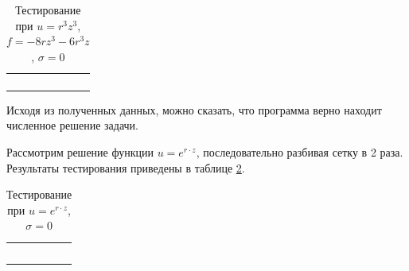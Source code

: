 \begin{table}
	\caption{Тестирование при $u = r^3 z^3$, $f = -8rz^3 - 6r^3 z$, $\sigma = 0$}
	\centering
	\small
	\begin{tabularx}{1.0\textwidth}{| >{\raggedright\arraybackslash}X | >{\raggedright\arraybackslash}X | >{\raggedright\arraybackslash}X |>{\raggedright\arraybackslash}X |}
		\hline
		\centering{Узел} & \centering{Значение} & \centering{Абсолютная погрешность} & \centering{Относительная погрешность} \tabularnewline \hline
		
		
		
		\centering{(${}^4/_3$; ${}^4/_3$)} & \centering{5.60268110E+000}& \centering{1.59745896E-002} & \centering{2.84313374E-003} \tabularnewline \hline
		
		\centering{(${}^5/_3$; ${}^4/_3$)} & \centering{1.09603120E+001} & \centering{1.36249123E-002} & \centering{1.24157014E-003} \tabularnewline \hline
		
		\centering{(${}^4/_3$; ${}^5/_3$)} & \centering{1.09509327E+001} & \centering{2.30042146E-002} & \centering{2.09625906E-003} \tabularnewline \hline
		
		\centering{(${}^5/_3$; ${}^5/_3$)} & \centering{2.14142095E+001} & \centering{1.92609735E-002} & \centering{8.98639979E-004} \tabularnewline \hline
		
	\end{tabularx}
	\label{tab:test2D9}
\end{table}

Исходя из полученных данных, можно сказать, что программа верно находит численное решение задачи.

Рассмотрим решение функции $u = e^{r \cdot z}$, последовательно разбивая сетку в 2 раза. Результаты тестирования приведены в таблице \ref{tab:test2D10}.

\begin{table}
	\caption{Тестирование при $u = e^{r \cdot z}$, $\sigma = 0$}
	\centering
	\small
	\begin{tabularx}{1.0\textwidth}{| >{\raggedright\arraybackslash}X | >{\raggedright\arraybackslash}X | >{\raggedright\arraybackslash}X |>{\raggedright\arraybackslash}X |}
		\hline
		\centering{Количество разбиений} & \centering{Средняя погрешность} & \centering{$\text{log}_2\left(\frac{\sigma_{i-1}}{\sigma_i}\right)$} \tabularnewline \hline		
		
		\centering{2} & \centering{1.7116567E-004}& \centering{-} \tabularnewline \hline
		
		\centering{4} & \centering{5.2066366E-005} & \centering{1.716969754} \tabularnewline \hline
		
		\centering{8} & \centering{1.4089198E-005} & \centering{1.885762274} \tabularnewline \hline
		
		\centering{16} & \centering{3.6602112E-006} & \centering{1.94459064} \tabularnewline \hline
		
		\centering{32} & \centering{9.3301457E-007} & \centering{1.971955381} \tabularnewline \hline
		
	\end{tabularx}
	\label{tab:test2D10}
\end{table}

